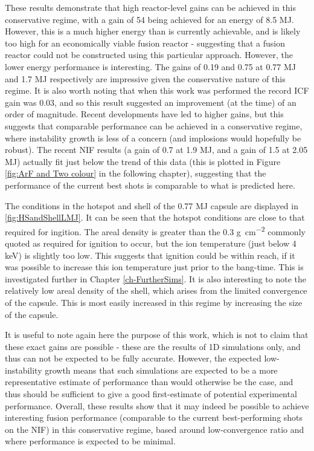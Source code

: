 These results demonstrate that high reactor-level gains can be achieved in this conservative regime, with a gain of 54 being achieved for an energy of 8.5 \unit{\mega\joule}. However, this is a much higher energy than is currently achievable, and is likely too high for an economically viable fusion reactor - suggesting that a fusion reactor could not be constructed using this particular approach. However, the lower energy performance is interesting. The gains of 0.19 and 0.75 at 0.77 \unit{\mega\joule} and 1.7 \unit{\mega\joule} respectively are impressive given the conservative nature of this regime. It is also worth noting that when this work was performed the record ICF gain was 0.03, and so this result suggested an improvement (at the time) of an order of magnitude. Recent developments have led to higher gains, but this suggests that comparable performance can be achieved in a conservative regime, where instability growth is less of a concern (and implosions would hopefully be robust). The recent NIF results (a gain of 0.7 at 1.9 MJ, and a gain of 1.5 at 2.05 MJ) actually fit just below the trend of this data (this is plotted in Figure \ref{fig:ArF and Two colour} in the following chapter), suggesting that the performance of the current best shots is comparable to what is predicted here.

The conditions in the hotspot and shell of the 0.77 \unit{\mega\joule} capsule are displayed in \ref{fig:HSandShellLMJ}. It can be seen that the hotspot conditions are close to that required for ingition. The areal density is greater than the 0.3 \unit{\gram\per\centi\meter\squared} commonly quoted as required for ignition to occur, but the ion temperature (just below 4 keV) is slightly too low. This suggests that ignition could be within reach, if it was possible to increase this ion temperature just prior to the bang-time. This is investigated further in Chapter \ref{ch-FurtherSims}. It is also interesting to note the relatively low areal density of the shell, which arises from the limited convergence of the capsule. This is most easily increased in this regime by increasing the size of the capsule.

It is useful to note again here the purpose of this work, which is not to claim that these exact gains are possible - these are the results of 1D simulations only, and thus can not be expected to be fully accurate. However, the expected low-instability growth means that such simulations are expected to be a more representative estimate of performance than would otherwise be the case, and thus should be sufficient to give a good first-estimate of potential experimental performance. Overall, these results show that it may indeed be possible to achieve interesting fusion performance (comparable to the current best-performing shots on the NIF) in this conservative regime, based around low-convergence ratio and where performance is expected to be minimal.

